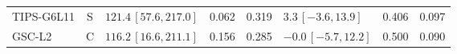 \begin{longtable}{lcp{37mm}rrp{37mm}rr}
TIPS-G6L11 & S & \(121.4\,[57.6,217.0]\) & 0.062 & 0.319 & \(3.3\,[-3.6,13.9]\) & 0.406 & 0.097\\
GSC-L2 & C & \(116.2\,[16.6,211.1]\) & 0.156 & 0.285 & \(-0.0\,[-5.7,12.2]\) & 0.500 & 0.090\\

\end{longtable}
